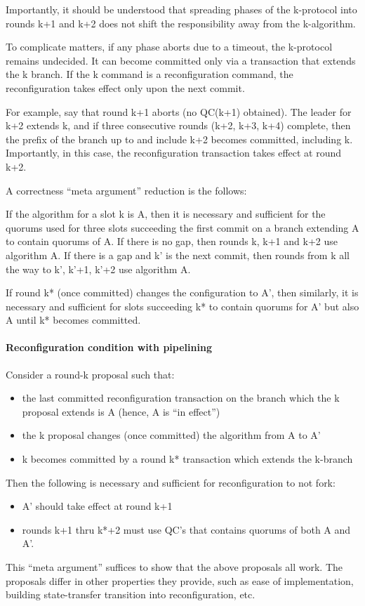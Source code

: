 Importantly, it should be understood that spreading phases of the k-protocol into rounds k+1 and k+2 does not shift the responsibility away from the k-algorithm.

To complicate matters, if any phase aborts due to a timeout, the k-protocol remains undecided. It can become committed only via a transaction that extends the k branch. If the k command is a reconfiguration command, the reconfiguration takes effect only upon the next commit.

For example, say that round k+1 aborts (no QC(k+1) obtained). The leader for k+2 extends k, and if three consecutive rounds (k+2, k+3, k+4) complete, then the prefix of the branch up to and include k+2 becomes committed, including k. Importantly, in this case, the reconfiguration transaction takes effect at round k+2.

A correctness “meta argument” reduction is the follows:

If the algorithm for a slot k is A, then it is necessary and sufficient for the quorums used for three slots succeeding the first commit on a branch extending A to contain quorums of A. If there is no gap, then rounds k, k+1 and k+2 use algorithm A. If there is a gap and k’ is the next commit, then rounds from k all the way to k’, k’+1, k’+2 use algorithm A.

If round k* (once committed) changes the configuration to A’, then similarly, it is necessary and sufficient for slots succeeding k* to contain quorums for A’ but also A until k* becomes committed.

\paragraph{Reconfiguration condition with pipelining}
Consider a round-k proposal such that:
\begin{itemize}
\item the last committed reconfiguration transaction on the branch which the k proposal extends is A (hence, A is “in effect”)
\item the k proposal changes (once committed) the algorithm from A to A’
\item k becomes committed by a round k* transaction which extends the k-branch
\end{itemize}
Then the following is necessary and sufficient for reconfiguration to not fork:
\begin{itemize}
\item A’ should take effect at round k+1
\item rounds k+1 thru k*+2 must use QC’s that contains quorums of both A and A’.
\end{itemize}

This “meta argument” suffices to show that the above proposals all work. The proposals differ in other properties they provide, such as ease of implementation, building state-transfer transition into reconfiguration, etc.
